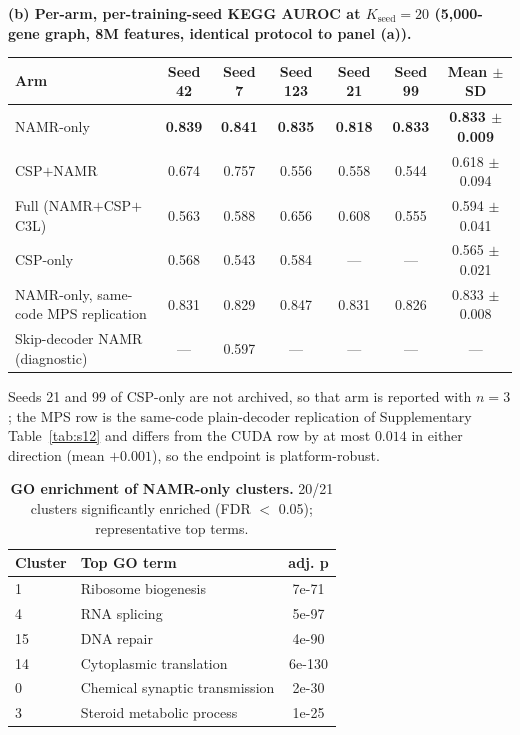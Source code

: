 \documentclass[11pt,a4paper]{article}
\newcommand{\supptab}[1]{Supplementary Table~\ref{#1}}
\begin{document}
\begin{table}[H]
\smallskip
\textbf{(b) Per-arm, per-training-seed KEGG AUROC at $K_{\text{seed}}=20$ (5,000-gene graph, 8M features, identical protocol to panel (a)).}
\begin{tabular}{@{}lcccccc@{}}
\toprule
\textbf{Arm} & \textbf{Seed 42} & \textbf{Seed 7} & \textbf{Seed 123} & \textbf{Seed 21} & \textbf{Seed 99} & \textbf{Mean $\pm$ SD} \\
\midrule
NAMR-only & \textbf{0.839} & \textbf{0.841} & \textbf{0.835} & \textbf{0.818} & \textbf{0.833} & \textbf{0.833 $\pm$ 0.009} \\
CSP$+$NAMR & 0.674 & 0.757 & 0.556 & 0.558 & 0.544 & 0.618 $\pm$ 0.094 \\
Full (NAMR$+$CSP$+$C3L) & 0.563 & 0.588 & 0.656 & 0.608 & 0.555 & 0.594 $\pm$ 0.041 \\
CSP-only & 0.568 & 0.543 & 0.584 & --- & --- & 0.565 $\pm$ 0.021 \\
NAMR-only, same-code MPS replication & 0.831 & 0.829 & 0.847 & 0.831 & 0.826 & 0.833 $\pm$ 0.008 \\
Skip-decoder NAMR (diagnostic) & --- & 0.597 & --- & --- & --- & --- \\
\bottomrule
\end{tabular}

{\footnotesize \noindent Seeds 21 and 99 of CSP-only are not archived, so that arm is reported with $n=3$; the MPS row is the same-code plain-decoder replication of \supptab{tab:s12} and differs from the CUDA row by at most $0.014$ in either direction (mean $+0.001$), so the endpoint is platform-robust.}
\end{table}

\begin{table}[H]
\centering
\caption{\textbf{GO enrichment of NAMR-only clusters.} 20/21 clusters significantly enriched (FDR $<$ 0.05); representative top terms.}
\label{tab:s8}
\footnotesize
\begin{tabular}{@{}llc@{}}
\toprule
\textbf{Cluster} & \textbf{Top GO term} & \textbf{adj. p} \\
\midrule
1 & Ribosome biogenesis & 7e-71 \\
4 & RNA splicing & 5e-97 \\
15 & DNA repair & 4e-90 \\
14 & Cytoplasmic translation & 6e-130 \\
0 & Chemical synaptic transmission & 2e-30 \\
3 & Steroid metabolic process & 1e-25 \\
\bottomrule
\end{tabular}
\end{table}
\end{document}
